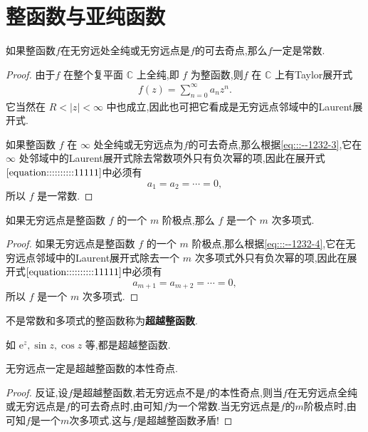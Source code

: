 \documentclass[../../main.tex]{subfiles}
\begin{document}
\section{整函数与亚纯函数}

\begin{theorem}\label{theorem:定理5.3.1}
如果整函数$f$在无穷远处全纯或无穷远点是$f$的可去奇点,那么$f$一定是常数.
\end{theorem}
\begin{proof}
由于\( f \) 在整个复平面 \( \mathbb{C} \) 上全纯,即 \( f \) 为整函数,则\( f \) 在 \( \mathbb{C} \) 上有Taylor展开式
\begin{align}
f(z) = \sum_{n = 0}^{\infty} a_n z^n. \label{equation::::::::::11111}
\end{align}
它当然在 \( R < |z| < \infty \) 中也成立,因此也可把它看成是无穷远点邻域中的Laurent展开式.

如果整函数 \( f \) 在 \( \infty \) 处全纯或无穷远点为$f$的可去奇点,那么根据\eqref{eq:::--1232-3},它在 \( \infty \) 处邻域中的Laurent展开式除去常数项外只有负次幂的项,因此在展开式\(\eqref{equation::::::::::11111}\)中必须有
\[
a_1 = a_2 = \cdots = 0,
\]
所以 \( f \) 是一常数.
\end{proof}

\begin{theorem}\label{theorem:定理5.3.2}
如果无穷远点是整函数 \( f \) 的一个 \( m \) 阶极点,那么 \( f \) 是一个 \( m \) 次多项式.
\end{theorem}
\begin{proof}
如果无穷远点是整函数 \( f \) 的一个 \( m \) 阶极点,那么根据\eqref{eq:::--1232-4},它在无穷远点邻域中的Laurent展开式除去一个 \( m \) 次多项式外只有负次幂的项,因此在展开式\(\eqref{equation::::::::::11111}\)中必须有
\[
a_{m + 1} = a_{m + 2} = \cdots = 0,
\]
所以 \( f \) 是一个 \( m \) 次多项式.
\end{proof}

\begin{definition}
不是常数和多项式的整函数称为\textbf{超越整函数}.
\end{definition}
\begin{remark}
如 \( \mathrm{e}^z,\sin z,\cos z \) 等,都是超越整函数.
\end{remark}

\begin{proposition}
无穷远点一定是超越整函数的本性奇点.
\end{proposition}
\begin{proof}
反证,设$f$是超越整函数,若无穷远点不是$f$的本性奇点,则当$f$在无穷远点全纯或无穷远点是$f$的可去奇点时,由可知$f$为一个常数.当无穷远点是$f$的$m$阶极点时,由可知$f$是一个$m$次多项式.这与$f$是超越整函数矛盾!
\end{proof}
\end{document}
